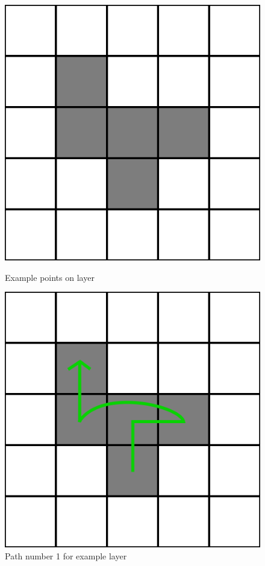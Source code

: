 \documentclass[titlepage]{article}
\begin{document}
\begin{figure}[H]
	\begin{center}
		\begin{minipage}{.45\linewidth}
			\includegraphics[width=\textwidth]{img/greedy/example-points-on-layer.png}
			\caption{Example points on layer}
			\label{img:greedy/example-points-on-layer}
		\end{minipage}
		\hspace{.05\linewidth}
		\begin{minipage}{.45\linewidth}
			\includegraphics[width=\textwidth]{img/greedy/example-path-sol-1}
			\caption{Path number 1 for example layer}
			\label{img:greedy/example-path-sol-1}
		\end{minipage}
	\end{center}
\end{figure}
\end{document}
